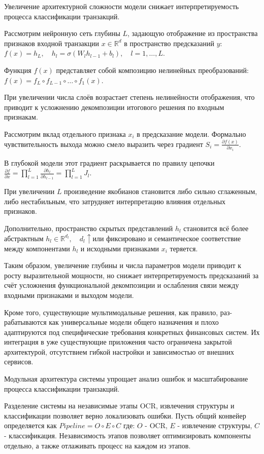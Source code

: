 \documentclass[14pt,a4paper]{extarticle}
\newenvironment{my_theorem}[1][Теорема]
{\par\indent\noindent{#1.} \upshape}
{\par}
\newenvironment{my_statement}[1][Утверждение]
{\par\indent\noindent{#1.} \normalfont}
{\par}
\newenvironment{my_proof}
{\par\indent\noindent{Доказательство.} \upshape}
{\par\hfill $\square$}
\begin{document}
\begin{my_theorem}
Увеличение архитектурной сложности модели
снижает интерпретируемость процесса
классификации транзакций.
\end{my_theorem}
\begin{my_proof}
Рассмотрим нейронную сеть глубины $L$, задающую отображение
из пространства признаков входной транзакции $x \in \mathbb{R}^d$
в пространство предсказаний $y$:
$f(x) = h_L, \quad
h_l = \sigma(W_l h_{l-1} + b_l), \quad l = 1,\dots,L.
$

Функция $f(x)$ представляет собой композицию нелинейных преобразований:
$
f(x) = f_L \circ f_{L-1} \circ \dots \circ f_1(x).
$

При увеличении числа слоёв возрастает степень нелинейности отображения,
что приводит к усложнению декомпозиции итогового решения
по входным признакам.

Рассмотрим вклад отдельного признака $x_i$ в предсказание модели.
Формально чувствительность выхода можно смело выразить через градиент
$
S_i = \frac{\partial f(x)}{\partial x_i}.
$

В глубокой модели этот градиент раскрывается по правилу цепочки
$
\frac{\partial f}{\partial x}
=
\prod_{l=1}^{L}
\frac{\partial h_l}{\partial h_{l-1}}
=
\prod_{l=1}^{L}
J_l.
$

При увеличении $L$ произведение якобианов становится
либо сильно сглаженным, либо нестабильным,
что затрудняет интерпретацию влияния отдельных признаков.

Дополнительно, пространство скрытых представлений $h_l$
становится всё более абстрактным $h_l \in \mathbb{R}^{d_l}, \quad d_l \uparrow \text{или фиксировано}$ и семантическое соответствие между компонентами $h_l$
и исходными признаками $x_i$ теряется.

Таким образом, увеличение глубины и числа параметров модели
приводит к росту выразительной мощности,
но снижает интерпретируемость предсказаний
за счёт усложнения функциональной декомпозиции и ослабления связи
между входными признаками и выходом модели.
\end{my_proof}

Кроме того, существующие мультимодальные решения, как правило, раз-рабатываются как универсальные модели общего назначения и плохо адаптируются под специфические требования конкретных финансовых систем. Их интеграция в уже существующие приложения часто ограничена закрытой архитектурой, отсутствием гибкой настройки и зависимостью от внешних сервисов.

\begin{my_statement}
Модульная архитектура системы упрощает
анализ ошибок и масштабирование
процесса классификации транзакций.
\end{my_statement}
\begin{my_proof}
Разделение системы на независимые этапы
OCR, извлечения структуры и классификации
позволяет верно локализовать ошибки.
Пусть общий конвейер определяется как
$Pipeline=O \circ E \circ C$
где:
$O$ - OCR,
$E$ - извлечение структуры,
$C$ - классификация.
Независимость этапов позволяет
оптимизировать компоненты отдельно, а также отлаживать процесс на каждом из этапов.
\end{my_proof}
\end{document}
